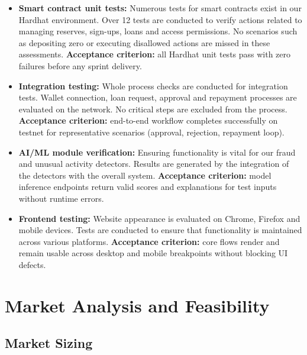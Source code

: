\documentclass[12pt,a4paper]{report}  %
\begin{document}
\begin{itemize}[noitemsep]
\item \textbf{Smart contract unit tests:} Numerous tests for smart contracts exist in our Hardhat environment. Over 12 tests are conducted to verify actions related to managing reserves, sign-ups, loans and access permissions. No scenarios such as depositing zero or executing disallowed actions are missed in these assessments. \textbf{Acceptance criterion:} all Hardhat unit tests pass with zero failures before any sprint delivery.
\item \textbf{Integration testing:} Whole process checks are conducted for integration tests. Wallet connection, loan request, approval and repayment processes are evaluated on the network. No critical steps are excluded from the process. \textbf{Acceptance criterion:} end-to-end workflow completes successfully on testnet for representative scenarios (approval, rejection, repayment loop).
\item \textbf{AI/ML module verification:} Ensuring functionality is vital for our fraud and unusual activity detectors. Results are generated by the integration of the detectors with the overall system. \textbf{Acceptance criterion:} model inference endpoints return valid scores and explanations for test inputs without runtime errors.
\item \textbf{Frontend testing:} Website appearance is evaluated on Chrome, Firefox and mobile devices. Tests are conducted to ensure that functionality is maintained across various platforms. \textbf{Acceptance criterion:} core flows render and remain usable across desktop and mobile breakpoints without blocking UI defects.
\end{itemize}


\chapter{Market Analysis and Feasibility}

\section{Market Sizing}
\end{document}
